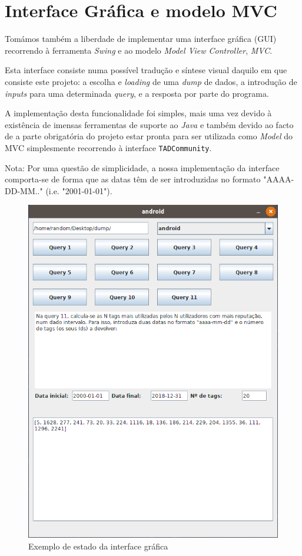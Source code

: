 \documentclass[10pt]{article}
\begin{document}
			
\pagebreak
\section{Interface Gráfica e modelo MVC}
	Tomámos também a liberdade de implementar uma interface 
gráfica (GUI) recorrendo à ferramenta \textit{Swing} e ao modelo
\textit{Model View Controller}, \emph{MVC}.

	Esta interface consiste numa possível tradução e síntese visual 
daquilo em que consiste este projeto: a escolha e \textit{loading} 
de uma \textit{dump} de dados, a introdução de \textit{inputs} para 
uma determinada \textit{query}, e a resposta por parte do programa.

	A implementação desta funcionalidade foi simples, mais uma vez 
devido à existência de imensas ferramentas de suporte ao \textit{Java} 
e também devido ao facto de a parte obrigatória do projeto estar 
pronta para ser utilizada como \textit{Model} do MVC simplesmente 
recorrendo à interface \texttt{TADCommunity}.

	Nota: Por uma questão de simplicidade, a nossa implementação 
da interface comporta-se de forma que as datas têm de ser 
introduzidas no formato "AAAA-DD-MM.." (i.e. "2001-01-01").

\begin{figure}[h]\centering
		\includegraphics[scale=0.55]{gui.png}
		\caption{Exemplo de estado da interface gráfica}
		\label{fig1:gui}

\end{figure}
	
\end{document}
